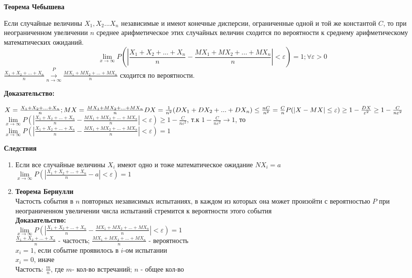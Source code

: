 \begin{center}
    \textbf{Теорема Чебышева}
\end{center} 

Если случайные величины $X_1,X_2 ... X_n$ независимые и имеют конечные дисперсии, ограниченные одной и той же константой $C$, то при неограниченном увеличении $n$ среднее арифметическое этих случайных величин сходится по вероятности 
к среднему арифметическому математических ожиданий.
$$\lim \limits_{x \to \infty} {P(|\frac{X_1+X_2+ ... +X_n}{n} - \frac{MX_1+MX_2+ ...+MX_n}{n}| < \varepsilon)=1}; \forall \varepsilon > 0$$
$ \frac{X_1+X_2+ ... +X_n}{n} \stackrel{P}{\xrightarrow[n\to\infty]{}} \frac{MX_1+MX_2+ ...+MX_n}{n} $ сходится по вероятности.

\textbf{Доказательство: }

$X=\frac{X_1+X_2+ ... +X_n}{n}; MX=\frac{MX_1+MX_2+ ... +MX_n}{n} \\
DX=\frac{1}{n^2}(DX_1+DX_2+ ... +DX_n) \le \frac{nC}{n^2} = \frac{C}{n} \\
P(|X-MX| \le \varepsilon) \ge 1 - \frac{DX}{\varepsilon^2} \ge 1 - \frac{C}{n \varepsilon^2}$ \\
$\lim \limits_{x \to \infty} {P(|\frac{X_1+X_2+ ... +X_n}{n} - \frac{MX_1+MX_2+ ...+MX_n}{n}| < \varepsilon) \ge 1-\frac{C}{n \varepsilon^2}}$, т.к $1-\frac{C}{n \varepsilon^2} \to 1$, то \\
$\lim \limits_{x \to \infty} {P(|\frac{X_1+X_2+ ... +X_n}{n} - \frac{MX_1+MX_2+ ...+MX_n}{n}| < \varepsilon)=1}$

\textbf {Следствия}

\begin{enumerate}
  \item Если все случайные величины $X_i$ имеют одно и тоже математическое ожидание $NX_i=a$ \\ 
    $\lim \limits_{x \to \infty} {P(|\frac{X_1+X_2+ ... +X_n}{n} - a| < \varepsilon)=1}$
  \item \textbf {Теорема Бернулли} \\
    Частость события в $n$ повторных независимых испытаниях, в каждом из которых она может произойти с вероятностью $P$ при неограниченном увеличении числа
    испытаний стремится к вероятности этого события\\
    \textbf{Доказательство: }\\
    $\lim \limits_{x \to \infty} {P(|\frac{X_1+X_2+ ... +X_n}{n} - \frac{MX_1+MX_2+ ...+MX_n}{n}| < \varepsilon)=1}$ \\
    $\frac{X_1+X_2+ ... +X_n}{n}$ - частость; $\frac{MX_1+MX_2+ ...+MX_n}{n}$ - вероятность \\
    $x_i=1$, если событие проявилось в $i$-ом испытании \\
    $x_i=0$, иначе \\
    Частость: $\frac{m}{n}$, где $m$- кол-во встречаний; $n$ - общее кол-во
\end{enumerate}